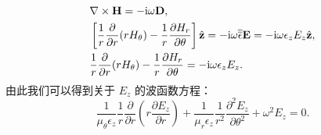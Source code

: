\begin{subequations}
  \begin{align}
    & \nabla \times {\bf H} = -\mathrm{i} \omega {\bf D}, \\
    & \left[\frac{1}{r} \frac{\partial}{\partial r}(r H_\theta) - \frac{1}{r}
      \frac{\partial H_r}{\partial\theta} \right] \hat{\bf z} = -\mathrm{i} \omega
      {\overline{\overline\epsilon}} {\bf E} = -\mathrm{i} \omega \epsilon_z E_z
      \hat{\bf z}, \\
    & \frac{1}{r} \frac{\partial}{\partial r}(r H_\theta) - \frac{1}{r}
      \frac{\partial H_r}{\partial\theta} = -\mathrm{i} \omega \epsilon_z E_z.
  \end{align}
\end{subequations}
由此我们可以得到关于 $E_z$ 的波函数方程：
\begin{equation}
  \frac{1}{\mu_\theta \epsilon_z} \frac{1}{r} \frac{\partial}{\partial r}
  \left(r \frac{\partial E_z}{\partial r} \right) + \frac{1}{\mu_r \epsilon_z}
  \frac{1}{r^2} \frac{\partial^2E_z}{\partial\theta^2} +\omega^2 E_z = 0.
\end{equation}
